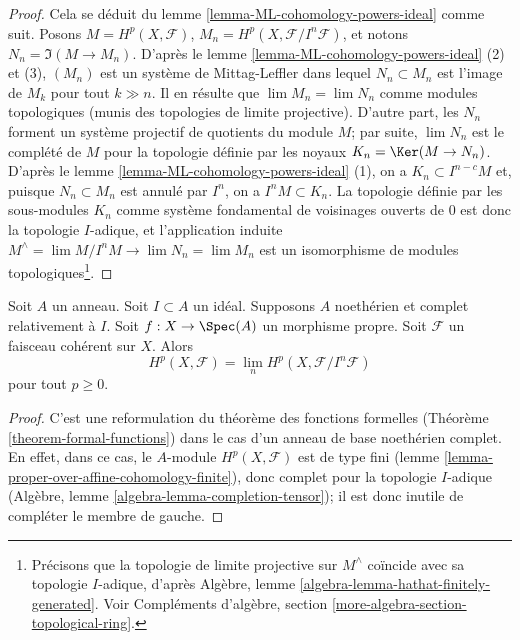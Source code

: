 \begin{proof}
Cela se déduit du lemme \ref{lemma-ML-cohomology-powers-ideal} comme suit.
Posons $M = H^p(X, \mathcal{F})$, $M_n = H^p(X, \mathcal{F}/I^n\mathcal{F})$,
et notons $N_n = \Im(M \to M_n)$. D'après le
lemme \ref{lemma-ML-cohomology-powers-ideal} (2) et (3),
$(M_n)$ est un système de Mittag-Leffler dans lequel
$N_n \subset M_n$ est l'image de $M_k$ pour tout $k \gg n$.
Il en résulte que $\lim M_n = \lim N_n$ comme modules topologiques (munis des
topologies de limite projective). D'autre part, les $N_n$ forment un système projectif de
quotients du module $M$; par suite, $\lim N_n$ est le complété de $M$
pour la topologie définie par les noyaux $K_n = \Ker(M \to N_n)$.
D'après le lemme \ref{lemma-ML-cohomology-powers-ideal} (1), on
a $K_n \subset I^{n - c}M$ et, puisque $N_n \subset M_n$
est annulé par $I^n$, on a $I^n M \subset K_n$.
La topologie définie par les sous-modules $K_n$
comme système fondamental de voisinages ouverts de $0$
est donc la topologie $I$-adique, et l'application
induite $M^\wedge = \lim M/I^nM \to \lim N_n = \lim M_n$
est un isomorphisme de modules topologiques\footnote{
Précisons que la topologie de limite projective sur $M^\wedge$ coïncide avec sa topologie
$I$-adique, d'après Algèbre,
lemme \ref{algebra-lemma-hathat-finitely-generated}.
Voir Compléments d'algèbre, section \ref{more-algebra-section-topological-ring}.}.
\end{proof}

\begin{lemma}
\label{lemma-spell-out-theorem-formal-functions}
Soit $A$ un anneau. Soit $I \subset A$ un idéal. Supposons $A$ noethérien
et complet relativement à $I$.
Soit $f : X \to \Spec(A)$ un morphisme propre.
Soit $\mathcal{F}$ un faisceau cohérent sur $X$.
Alors
$$
H^p(X, \mathcal{F}) = \lim_n H^p(X, \mathcal{F}/I^n\mathcal{F})
$$
pour tout $p \geq 0$.
\end{lemma}

\begin{proof}
C'est une reformulation du théorème des fonctions formelles
(Théorème \ref{theorem-formal-functions}) dans le
cas d'un anneau de base noethérien complet. En effet, dans ce cas, le
$A$-module $H^p(X, \mathcal{F})$ est de type
fini (lemme \ref{lemma-proper-over-affine-cohomology-finite}), donc complet pour la topologie
$I$-adique (Algèbre, lemme \ref{algebra-lemma-completion-tensor});
il est donc inutile de compléter le membre de gauche.
\end{proof}

